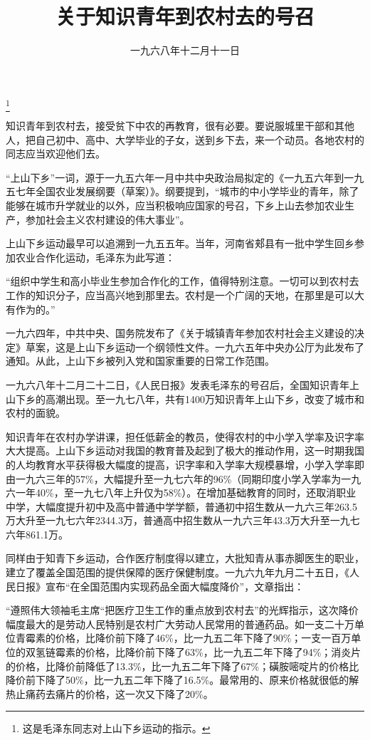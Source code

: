 
\title{关于知识青年到农村去的号召}
\date{一九六八年十二月十一日}
\thanks{这是毛泽东同志对上山下乡运动的指示。}
\maketitle


知识青年到农村去，接受贫下中农的再教育，很有必要。要说服城里干部和其他人，把自己初中、高中、大学毕业的子女，送到乡下去，来一个动员。各地农村的同志应当欢迎他们去。

\begin{maonote}
“上山下乡”一词，源于一九五六年一月中共中央政治局拟定的《一九五六年到一九五七年全国农业发展纲要（草案）》。纲要提到，“城市的中小学毕业的青年，除了能够在城市升学就业的以外，应当积极响应国家的号召，下乡上山去参加农业生产，参加社会主义农村建设的伟大事业”。

上山下乡运动最早可以追溯到一九五五年。当年，河南省郏县有一批中学生回乡参加农业合作化运动，毛泽东为此写道：

“组织中学生和高小毕业生参加合作化的工作，值得特别注意。一切可以到农村去工作的知识分子，应当高兴地到那里去。农村是一个广阔的天地，在那里是可以大有作为的。”

一九六四年，中共中央、国务院发布了《关于城镇青年参加农村社会主义建设的决定》草案，这是上山下乡运动一个纲领性文件。一九六五年中央办公厅为此发布了通知。从此，上山下乡被列入党和国家重要的日常工作范围。

一九六八年十二月二十二日，《人民日报》发表毛泽东的号召后，全国知识青年上山下乡的高潮出现。至一九七八年，共有1400万知识青年上山下乡，改变了城市和农村的面貌。

知识青年在农村办学讲课，担任低薪金的教员，使得农村的中小学入学率及识字率大大提高。上山下乡运动对我国的教育普及起到了极大的推动作用，这一时期我国的人均教育水平获得极大幅度的提高，识字率和入学率大规模暴增，小学入学率即由一九六三年的57\%，大幅提升至一九七六年的96\%（同期印度小学入学率为一九六一年40\%，至一九七八年上升仅为58\%）。在增加基础教育的同时，还取消职业中学，大幅度提升初中及高中普通中学学额，普通初中招生数从一九六三年263.5万大升至一九七六年2344.3万，普通高中招生数从一九六三年43.3万大升至一九七六年861.1万。

同样由于知青下乡运动，合作医疗制度得以建立，大批知青从事赤脚医生的职业，建立了覆盖全国范围的提供保障的医疗保健制度。一九六九年九月二十五日，《人民日报》宣布“在全国范围内实现药品全面大幅度降价”，文章指出：

“遵照伟大领袖毛主席“把医疗卫生工作的重点放到农村去”的光辉指示，这次降价幅度最大的是劳动人民特别是农村广大劳动人民常用的普通药品。如一支二十万单位青霉素的价格，比降价前下降了46\%，比一九五二年下降了90\%；一支一百万单位的双氢链霉素的价格，比降价前下降了63\%，比一九五二年下降了94\%；消炎片的价格，比降价前降低了13.3\%，比一九五二年下降了67\%；磺胺嘧啶片的价格比降价前下降了50\%，比一九五二年下降了16.5\%。最常用的、原来价格就很低的解热止痛药去痛片的价格，这一次又下降了20\%。


\end{maonote}
